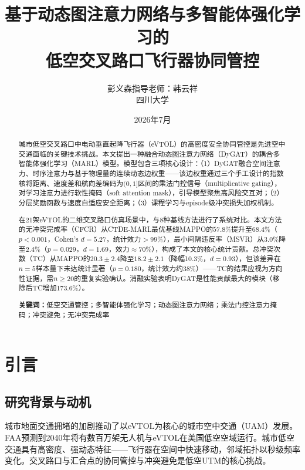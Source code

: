 \documentclass[12pt,a4paper,UTF8]{ctexart}
\title{\textbf{基于动态图注意力网络与多智能体强化学习的\\低空交叉路口飞行器协同管控}}
\author{彭义森\quad 指导老师：韩云祥\\[4pt]\small 四川大学}
\date{2026年7月}
\begin{document}
\maketitle

\begin{abstract}
城市低空交叉路口中电动垂直起降飞行器（eVTOL）的高密度安全协同管控是先进空中交通面临的关键技术挑战。本文提出一种融合动态图注意力网络（DyGAT）的耦合多智能体强化学习（MARL）模型。模型包含三项核心设计：（1）DyGAT融合空间注意力、时序注意力与基于物理量的连续动态边权重——该边权重通过三个手工设计的指数核将距离、速度差和航向差编码为$(0,1]$区间的乘法门控信号（multiplicative gating），对学习注意力进行软性掩码（soft attention mask），引导模型聚焦高风险交互对；（2）分层奖励函数与速度自适应安全距离；（3）课程学习与episode级冲突损失加权机制。

在21架eVTOL的二维交叉路口仿真场景中，与8种基线方法进行了系统对比。本文方法的无冲突完成率（CFCR）从CTDE-MARL最优基线MAPPO的$57.8\%$提升至$68.4\%$（$p<0.001$，Cohen's $d=5.27$，统计效力$>99\%$），最小间隔违反率（MSVR）从$3.0\%$降至$2.4\%$（$p=0.029$，$d=1.69$，效力$\approx70\%$），构成了本文的核心统计贡献。总冲突次数（TC）从MAPPO的$20.3\pm2.4$降至$18.2\pm2.1$（降幅10.3\%，$d=0.93$），但该差异在$n=5$样本量下未达统计显著（$p=0.180$，统计效力约38\%）——TC的结果应视为方向性证据，需$n\geq20$的重复实验确认。消融实验表明DyGAT是性能贡献最大的模块（移除后TC增加173.6\%）。

\noindent\textbf{关键词：}低空交通管控；多智能体强化学习；动态图注意力网络；乘法门控注意力掩码；冲突避免；无冲突完成率
\end{abstract}

\section{引言}

\subsection{研究背景与动机}

城市地面交通拥堵的加剧推动了以eVTOL为核心的城市空中交通（UAM）发展。FAA预测到2040年将有数百万架无人机与eVTOL在美国低空空域运行\cite{ref1}。城市低空交通具有高密度、强动态特征——飞行器在空间中快速移动，邻域拓扑以秒级频率变化。交叉路口与汇合点的协同管控与冲突避免是低空UTM的核心挑战。
\end{document}
